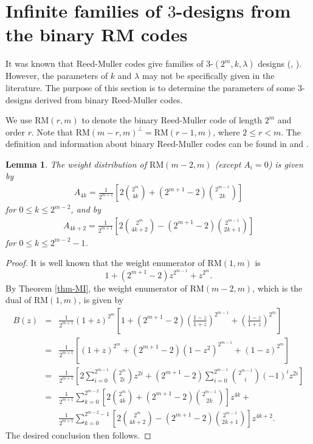 \documentclass[1p,final]{elsarticle}
\newtheorem{lemma}[theorem]{Lemma}
\newcommand{\RM}{{\mathrm{RM}}}
\begin{document}
\section{Infinite families of $3$-designs from the binary RM codes}\label{sec-brmdesigns}


It was known that Reed-Muller codes give families of $3$-$(2^m, k, \lambda)$ designs 
(\cite[Chapter 15]{MS77}, \cite{Tonchevhb}). However, the parameters of $k$ and $\lambda$ 
may not be specifically given in the literature. The purpose of this section is to determine 
the parameters of some $3$-designs derived from binary Reed-Muller codes.

We use $\RM(r, m)$ to denote the binary Reed-Muller code of length $2^m$ and order $r$.
Note that $\RM(m-r, m)^\perp=\RM(r-1, m)$, where $2 \leq r < m$. The definition and 
information about binary Reed-Muller codes can be found in \cite[Section 4.5]{vanLint}  
and \cite[Chapters 13 and 14]{MS77}.  


\begin{lemma}\label{lem-RMwt1}
The weight distribution of $\RM(m-2, m)$ (except $A_i=0$) is given by
\begin{eqnarray*}
A_{4k}= \frac{1}{2^{m+1}} \left[2\binom{2^m}{4k} + (2^{m+1}-2) \binom{2^{m-1}}{2k}\right]
\end{eqnarray*}
for $0 \leq k \leq 2^{m-2}$, and
by
\begin{eqnarray*}
A_{4k+2}= \frac{1}{2^{m+1}} \left[2\binom{2^m}{4k+2} - (2^{m+1}-2) \binom{2^{m-1}}{2k+1}\right]
\end{eqnarray*}
for $0 \leq k \leq 2^{m-2}-1$.
\end{lemma}

\begin{proof}
It is well known that the weight enumerator of $\RM(1, m)$ is
$$
1 + (2^{m+1}-2)z^{2^{m-1}} + z^{2^m}.
$$
By Theorem \ref{thm-MI}, the weight enumerator of RM$(m-2, m)$, which is the dual
of RM$(1, m)$, is given by
\begin{eqnarray*}
B(z) &=& \frac{1}{2^{m+1}} (1+z)^{2^m}\left[ 1 +
             (2^{m+1}-2) \left(\frac {1-z} {1+z}\right)^{2^{m-1}} + 
                 \left(\frac {1-z} {1+z}\right)^{2^m} \right] \\
&=& \frac{1}{2^{m+1}} \left[ (1+z)^{2^m} +
             (2^{m+1}-2) (1-z^2)^{2^{m-1}} + (1-z)^{2^m} \right] \\
&=& \frac{1}{2^{m+1}} \left[ 2 \sum_{i=0}^{2^{m-1}} \binom{2^m}{2i} z^{2i}
        +(2^{m+1}-2) \sum_{i=0}^{2^{m-1}} \binom{2^{m-1}}{i} (-1)^i z^{2i}\right] \\
&=&\frac{1}{2^{m+1}} \sum_{k=0}^{2^{m-2}} \left[ 2\binom{2^m}{4k} + (2^{m+1}-2) \binom{2^{m-1}}{2k} \right]
     z^{4k} + \\
& & \frac{1}{2^{m+1}}\sum_{k=0}^{2^{m-2}-1} \left[ 2\binom{2^m}{4k+2} - (2^{m+1}-2) \binom{2^{m-1}}{2k+1}\right]
     z^{4k+2}.
\end{eqnarray*}
The desired conclusion then follows.
\end{proof}
\end{document}
